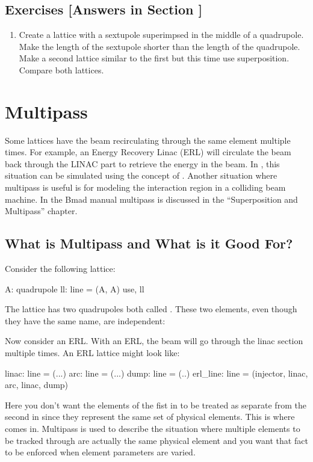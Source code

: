 \documentclass{hitec}     %
\newcommand{\Section}[1]{\section{#1}\vspace*{-1ex}}
\begin{document}
\subsection{Exercises [Answers in Section ]}
\label{s:super.ex}

\begin{enumerate}[label=\thesection.\arabic{enumi}]
\item
Create a lattice with a sextupole superimpsed in the middle of a quadrupole. Make the length of the 
sextupole shorter than the length of the quadrupole. Make a second lattice similar to the first but
this time use  superposition. Compare both lattices.
\end{enumerate}

\newpage

\Section{Multipass}
\label{s:multipass}

Some lattices have the beam recirculating through the same element multiple times. For example, an
Energy Recovery Linac (ERL) will circulate the beam back through the LINAC part to retrieve the
energy in the beam. In \bmad, this situation can be simulated using the concept of .
Another situation where multipass is useful is for modeling the interaction region in a colliding
beam machine. In the Bmad manual multipass is discussed in the ``Superposition and Multipass''
chapter.

\subsection{What is Multipass and What is it Good For?}

Consider the following lattice:
\begin{code}
A: quadrupole
ll: line = (A, A)
use, ll
\end{code}
The lattice has two quadrupoles both called . These two elements, even though they have the
same name, are independent:
Now consider an ERL. With an ERL, the beam will go through the linac section multiple times. An ERL
lattice might look like:
\begin{code}
linac: line = (...)
arc: line = (...)
dump: line = (..)
erl_line: line = (injector, linac, arc, linac, dump)
\end{code}
Here you don't want the elements of the fist  in  to be treated as separate
from the second  in  since they represent the same set of physical elements.
This is where  comes in.  Multipass is used to describe the situation where multiple
elements to be tracked through are actually the same physical element and you want that fact to
be enforced when element parameters are varied.
\end{document}

